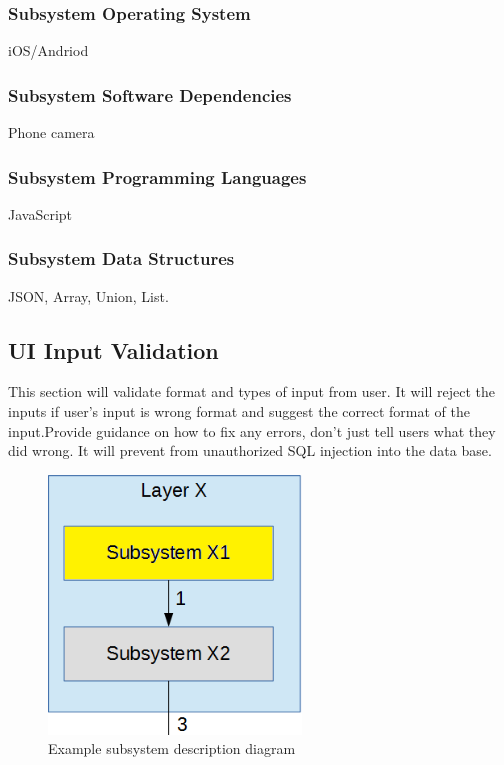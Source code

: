 \subsubsection{Subsystem Operating System}
iOS/Andriod

\subsubsection{Subsystem Software Dependencies}
Phone camera

\subsubsection{Subsystem Programming Languages}
JavaScript

\subsubsection{Subsystem Data Structures}
JSON, Array, Union, List.



\subsection{UI Input Validation}
This section will validate format and types of input from user. It will reject the inputs if user's input is wrong format and suggest the correct format of the input.Provide guidance on how to fix any errors, don't just tell users what they did wrong. It will prevent from unauthorized SQL injection into the data base.

\begin{figure}[h!]
	\centering
 	\includegraphics[width=0.60\textwidth]{images/subsystem}
 \caption{Example subsystem description diagram}
\end{figure}

